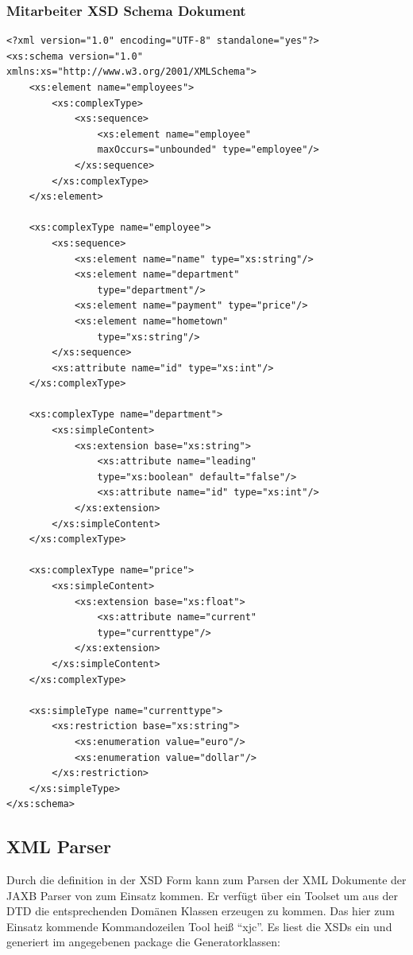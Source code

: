 \documentclass[DIV=calc,paper=a4,fontsize=9pt,twocolumn]{scrartcl}
\begin{document}
\subsubsection{Mitarbeiter XSD Schema Dokument}

\lstset{language=XML}
\begin{lstlisting}
<?xml version="1.0" encoding="UTF-8" standalone="yes"?>
<xs:schema version="1.0" 
xmlns:xs="http://www.w3.org/2001/XMLSchema">
    <xs:element name="employees">
        <xs:complexType>
            <xs:sequence>
                <xs:element name="employee" 
                maxOccurs="unbounded" type="employee"/>
            </xs:sequence>
        </xs:complexType>
    </xs:element>

    <xs:complexType name="employee">
        <xs:sequence>
            <xs:element name="name" type="xs:string"/>
            <xs:element name="department" 
                type="department"/>
            <xs:element name="payment" type="price"/>
            <xs:element name="hometown" 
                type="xs:string"/>
        </xs:sequence>
        <xs:attribute name="id" type="xs:int"/>
    </xs:complexType>

    <xs:complexType name="department">
        <xs:simpleContent>
            <xs:extension base="xs:string">
                <xs:attribute name="leading" 
                type="xs:boolean" default="false"/>
                <xs:attribute name="id" type="xs:int"/>
            </xs:extension>
        </xs:simpleContent>
    </xs:complexType>

    <xs:complexType name="price">
        <xs:simpleContent>
            <xs:extension base="xs:float">
                <xs:attribute name="current" 
                type="currenttype"/>
            </xs:extension>
        </xs:simpleContent>
    </xs:complexType>

    <xs:simpleType name="currenttype">
        <xs:restriction base="xs:string">
            <xs:enumeration value="euro"/>
            <xs:enumeration value="dollar"/>
        </xs:restriction>
    </xs:simpleType>
</xs:schema>
\end{lstlisting}

\subsection{XML Parser}

Durch die definition in der XSD Form kann zum Parsen der XML Dokumente der JAXB Parser von \citet{jsr222} zum Einsatz kommen. Er verfügt über ein Toolset um aus der DTD die entsprechenden Domänen Klassen erzeugen zu kommen. Das hier zum Einsatz kommende Kommandozeilen Tool heiß \enquote{xjc}. Es liest die XSDs ein und generiert im angegebenen package die Generatorklassen:
\end{document}
